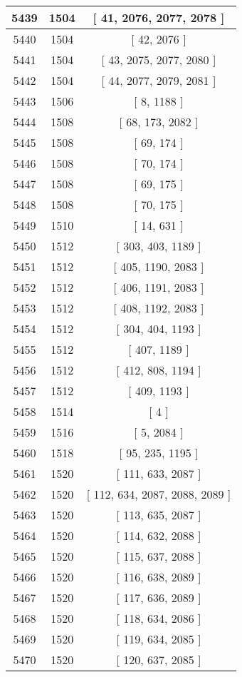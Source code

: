 \begin{center}
\begin{longtable}[H]{|| c c c ||}
\hline
5439 & 1504 & [ 41, 2076, 2077, 2078 ] \\ 
\hline
5440 & 1504 & [ 42, 2076 ] \\ 
\hline
5441 & 1504 & [ 43, 2075, 2077, 2080 ] \\ 
\hline
5442 & 1504 & [ 44, 2077, 2079, 2081 ] \\ 
\hline
5443 & 1506 & [ 8, 1188 ] \\ 
\hline
5444 & 1508 & [ 68, 173, 2082 ] \\ 
\hline
5445 & 1508 & [ 69, 174 ] \\ 
\hline
5446 & 1508 & [ 70, 174 ] \\ 
\hline
5447 & 1508 & [ 69, 175 ] \\ 
\hline
5448 & 1508 & [ 70, 175 ] \\ 
\hline
5449 & 1510 & [ 14, 631 ] \\ 
\hline
5450 & 1512 & [ 303, 403, 1189 ] \\ 
\hline
5451 & 1512 & [ 405, 1190, 2083 ] \\ 
\hline
5452 & 1512 & [ 406, 1191, 2083 ] \\ 
\hline
5453 & 1512 & [ 408, 1192, 2083 ] \\ 
\hline
5454 & 1512 & [ 304, 404, 1193 ] \\ 
\hline
5455 & 1512 & [ 407, 1189 ] \\ 
\hline
5456 & 1512 & [ 412, 808, 1194 ] \\ 
\hline
5457 & 1512 & [ 409, 1193 ] \\ 
\hline
5458 & 1514 & [ 4 ] \\ 
\hline
5459 & 1516 & [ 5, 2084 ] \\ 
\hline
5460 & 1518 & [ 95, 235, 1195 ] \\ 
\hline
5461 & 1520 & [ 111, 633, 2087 ] \\ 
\hline
5462 & 1520 & [ 112, 634, 2087, 2088, 2089 ] \\ 
\hline
5463 & 1520 & [ 113, 635, 2087 ] \\ 
\hline
5464 & 1520 & [ 114, 632, 2088 ] \\ 
\hline
5465 & 1520 & [ 115, 637, 2088 ] \\ 
\hline
5466 & 1520 & [ 116, 638, 2089 ] \\ 
\hline
5467 & 1520 & [ 117, 636, 2089 ] \\ 
\hline
5468 & 1520 & [ 118, 634, 2086 ] \\ 
\hline
5469 & 1520 & [ 119, 634, 2085 ] \\ 
\hline
5470 & 1520 & [ 120, 637, 2085 ] \\ 

\end{longtable}
\end{center}
